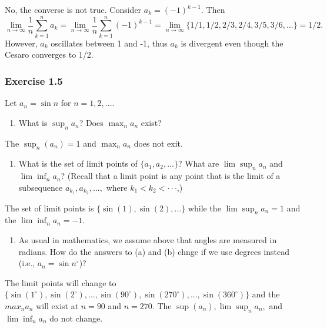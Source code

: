 \documentclass[12pt,]{article}
\providecommand{\tightlist}{%
  \setlength{\itemsep}{0pt}\setlength{\parskip}{0pt}}
\begin{document}
No, the converse is not true. Consider \(a_k = (-1)^{k-1}\). Then
\[\lim_{n\rightarrow\infty} \frac{1}{n}\sum_{k = 1}^n a_k = \lim_{n\rightarrow\infty} \frac{1}{n}\sum_{k = 1}^n (-1)^{k-1} = \lim_{n\rightarrow\infty} \{1/1, 1/2, 2/3, 2/4, 3/5, 3/6,...\} = 1/2.\]
However, \(a_k\) oscillates between 1 and -1, thus \(a_k\) is divergent
even though the Cesaro converges to 1/2.

\hypertarget{exercise-1.5}{%
\subsubsection{Exercise 1.5}\label{exercise-1.5}}

Let \(a_n = \sin n\) for \(n = 1,2, ...\).

\begin{enumerate}
\def\labelenumi{\alph{enumi}.}
\tightlist
\item
  What is \(\sup_n a_n\)? Does \(\max_n a_n\) exist?
\end{enumerate}

The \(\sup_n(a_n) = 1\) and \(\max_n a_n\) does not exit.

\begin{enumerate}
\def\labelenumi{\alph{enumi}.}
\setcounter{enumi}{1}
\tightlist
\item
  What is the set of limit points of \(\{a_1, a_2, ...\}\)? What are
  \(\lim\sup_n a_n\) and \(\lim\inf_n a_n\)? (Recall that a limit point
  is any point that is the limit of a subsequence
  \(a_{k_1}, a_{k_2}, ...,\) where \(k_1 < k_2 < \cdot \cdot \cdot\),)
\end{enumerate}

The set of limit points is \(\{\sin(1), \sin(2), ...\}\) while the
\(\lim\sup_n a_n = 1\) and the \(\lim\inf_n a_n = -1.\)

\begin{enumerate}
\def\labelenumi{\alph{enumi}.}
\setcounter{enumi}{2}
\tightlist
\item
  As usual in mathematics, we assume above that angles are measured in
  radians. How do the answers to (a) and (b) chnge if we use degrees
  instead (i.e., \(a_n = \sin n^{\circ}\))?
\end{enumerate}

The limit points will change to
\(\{\sin(1^{\circ}), \sin(2^{\circ}), ..., \sin(90^{\circ}), \sin(270^{\circ}), ..., \sin(360^{\circ})\}\)
and the \(max_n a_n\) will exist at \(n = 90\) and \(n = 270\). The
\(\sup(a_n), \lim\sup_n a_n,\) and \(\lim\inf_n a_n\) do not change.
\end{document}
